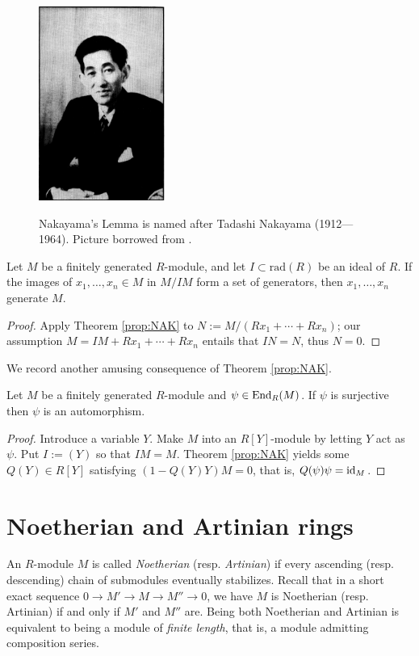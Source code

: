\begin{figure}[h]
	\centering \includegraphics[height=180pt]{Nakayama.png} \\ \vspace{1em}
	\begin{minipage}{0.7\textwidth}
		\small Nakayama's Lemma is named after Tadashi Nakayama (1912---1964). Picture borrowed from \cite{obi-NAK}.
	\end{minipage}
\end{figure}

\begin{corollary}\label{prop:NAK-generation}
	Let $M$ be a finitely generated $R$-module, and let $I \subset \mathrm{rad}(R)$ be an ideal of $R$. If the images of $x_1, \ldots, x_n \in M$ in $M/IM$ form a set of generators, then $x_1, \ldots, x_n$ generate $M$.
\end{corollary}
\begin{proof}
	Apply Theorem \ref{prop:NAK} to $N := M/(Rx_1 + \cdots + Rx_n)$; our assumption $M = IM + Rx_1 + \cdots + Rx_n$ entails that $IN=N$, thus $N=0$.
\end{proof}

We record another amusing consequence of Theorem \ref{prop:NAK}.
\begin{proposition}
	Let $M$ be a finitely generated $R$-module and $\psi \in \operatorname{End}_R(M)$. If $\psi$ is surjective then $\psi$ is an automorphism.
\end{proposition}
\begin{proof}
	Introduce a variable $Y$. Make $M$ into an $R[Y]$-module by letting $Y$ act as $\psi$. Put $I := (Y)$ so that $IM=M$. Theorem \ref{prop:NAK} yields some $Q(Y) \in R[Y]$ satisfying $(1 - Q(Y)Y) M = 0$, that is, $Q(\psi)\psi = \mathrm{id}_M$.
\end{proof}

\section{Noetherian and Artinian rings}
An $R$-module $M$ is called \emph{Noetherian} (resp. \emph{Artinian}) if every ascending (resp. descending) chain of submodules eventually stabilizes. Recall that in a short exact sequence $0 \to M' \to M \to M'' \to 0$, we have $M$ is Noetherian (resp. Artinian) if and only if $M'$ and $M''$ are. Being both Noetherian and Artinian is equivalent to being a module of \emph{finite length}, that is, a module admitting composition series. 

